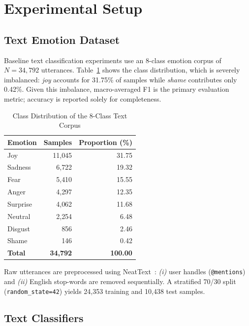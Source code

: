 \documentclass[conference]{IEEEtran}
\begin{document}
\section{Experimental Setup}
\label{sec:setup}

\subsection{Text Emotion Dataset}

Baseline text classification experiments use an 8-class emotion
corpus of $N{=}34{,}792$ utterances.
Table~\ref{tab:class_dist} shows the class distribution, which
is severely imbalanced: \textit{joy} accounts for 31.75\% of
samples while \textit{shame} contributes only 0.42\%.
Given this imbalance, macro-averaged F1 is the primary evaluation
metric; accuracy is reported solely for completeness.

\begin{table}[htbp]
\centering
\caption{Class Distribution of the 8-Class Text Corpus}
\label{tab:class_dist}
\begin{tabular}{lrr}
\toprule
\textbf{Emotion} & \textbf{Samples} & \textbf{Proportion (\%)} \\
\midrule
Joy      & 11{,}045 & 31.75 \\
Sadness  &  6{,}722 & 19.32 \\
Fear     &  5{,}410 & 15.55 \\
Anger    &  4{,}297 & 12.35 \\
Surprise &  4{,}062 & 11.68 \\
Neutral  &  2{,}254 &  6.48 \\
Disgust  &    856   &  2.46 \\
Shame    &    146   &  0.42 \\
\midrule
\textbf{Total} & \textbf{34{,}792} & \textbf{100.00} \\
\bottomrule
\end{tabular}
\end{table}

Raw utterances are preprocessed using NeatText~\cite{neattext2021}:
\textit{(i)} user handles (\texttt{@mentions}) and
\textit{(ii)} English stop-words are removed sequentially.
A stratified 70/30 split (\texttt{random\_state=42}) yields
24,353 training and 10,438 test samples.

\subsection{Text Classifiers}
\end{document}

